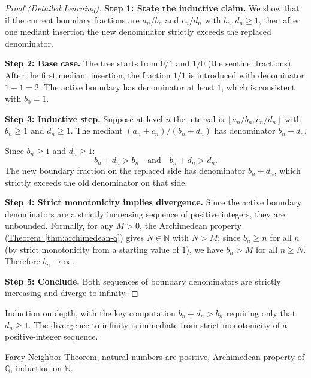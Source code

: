 \begin{proof}[Proof (Detailed Learning)]
\textbf{Step 1: State the inductive claim.}
We show that if the current boundary fractions are $a_n/b_n$ and
$c_n/d_n$ with $b_n, d_n \geq 1$, then after one mediant insertion the
new denominator strictly exceeds the replaced denominator.

\textbf{Step 2: Base case.}
The tree starts from $0/1$ and $1/0$ (the sentinel fractions).
After the first mediant insertion, the fraction $1/1$ is introduced with
denominator $1 + 1 = 2$.  The active boundary has denominator at least
$1$, which is consistent with $b_0 = 1$.

\textbf{Step 3: Inductive step.}
Suppose at level $n$ the interval is $[a_n/b_n, c_n/d_n]$ with
$b_n \geq 1$ and $d_n \geq 1$.  The mediant $(a_n + c_n)/(b_n + d_n)$
has denominator $b_n + d_n$.

Since $b_n \geq 1$ and $d_n \geq 1$:
\[
b_n + d_n > b_n \quad \text{and} \quad b_n + d_n > d_n.
\]
The new boundary fraction on the replaced side has denominator $b_n + d_n$,
which strictly exceeds the old denominator on that side.

\textbf{Step 4: Strict monotonicity implies divergence.}
Since the active boundary denominators are a strictly increasing sequence
of positive integers, they are unbounded.  Formally, for any $M > 0$,
the Archimedean property (\hyperref[thm:archimedean-q]{Theorem~\ref*{thm:archimedean-q}})
gives $N \in \mathbb{N}$ with $N > M$; since $b_n \geq n$ for all $n$
(by strict monotonicity from a starting value of $1$), we have
$b_n > M$ for all $n \geq N$.  Therefore $b_n \to \infty$.

\textbf{Step 5: Conclude.}
Both sequences of boundary denominators are strictly increasing and
diverge to infinity.
\end{proof}

\begin{remark*}
Induction on depth, with the key computation $b_n + d_n > b_n$ requiring
only that $d_n \geq 1$.  The divergence to infinity is immediate from
strict monotonicity of a positive-integer sequence.
\end{remark*}

\begin{dependencies}
\hyperref[thm:farey-neighbor-theorem]{Farey Neighbor Theorem},
\hyperref[cor:n-positive]{natural numbers are positive},
\hyperref[thm:archimedean-q]{Archimedean property of $\mathbb{Q}$},
induction on $\mathbb{N}$.
\end{dependencies}
